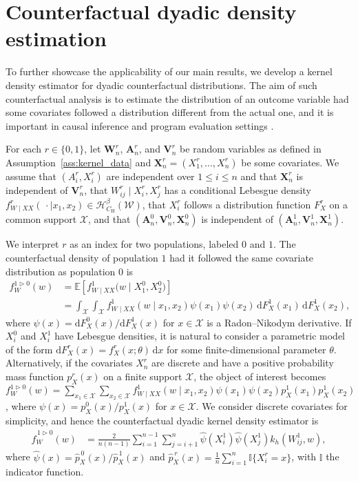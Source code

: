 \documentclass[11pt,lof]{puthesis}
\newcommand{\E}{\ensuremath{\mathbb{E}}}
\newcommand{\I}{\ensuremath{\mathbb{I}}}
\newcommand{\rH}{\ensuremath{\mathrm{H}}}
\newcommand{\bW}{\ensuremath{\mathbf{W}}}
\newcommand{\bX}{\ensuremath{\mathbf{X}}}
\newcommand{\bA}{\ensuremath{\mathbf{A}}}
\newcommand{\bV}{\ensuremath{\mathbf{V}}}
\newcommand{\cH}{\ensuremath{\mathcal{H}}}
\newcommand{\cX}{\ensuremath{\mathcal{X}}}
\newcommand{\cW}{\ensuremath{\mathcal{W}}}
\newcommand{\diff}[1]{\,\mathrm{d}#1}
\theoremstyle{break}
\theoremstyle{proof}
\begin{document}
\section{Counterfactual dyadic density estimation}
\label{sec:kernel_counterfactual}

To further showcase the applicability of our main results, we develop a kernel
density estimator for dyadic counterfactual distributions. The aim of such
counterfactual analysis is to estimate the distribution of an outcome variable
had some covariates followed a distribution different from the actual one, and
it is important in causal inference and program evaluation settings
\citep{dinardo1996distribution,chernozhukov2013inference}.

For each $r \in \{0,1\}$, let $\bW_n^r$, $\bA_n^r$, and $\bV_n^r$ be random
variables as defined in Assumption~\ref{ass:kernel_data} and
$\bX_n^r = (X_1^r, \ldots, X_n^r)$ be some covariates.
We assume that $(A_i^r, X_i^r)$ are independent over $1 \leq i \leq n$
and that $\bX_n^r$ is independent of $\bV_n^r$, that
$W_{i j}^r \mid X_i^r, X_j^r$ has a conditional Lebesgue density
$f_{W \mid XX}^r(\,\cdot \mid x_1, x_2) \in \cH^\beta_{C_\rH}(\cW)$,
that $X_i^r$ follows a distribution function $F_X^r$ on a common support $\cX$,
and that $(\bA_n^0, \bV_n^0, \bX_n^0)$
is independent of $(\bA_n^1, \bV_n^1, \bX_n^1)$.

We interpret $r$ as an index for two populations, labeled $0$ and $1$. The
counterfactual density of population $1$ had it followed the
same covariate distribution as population $0$ is
%
\begin{align*}
  f_W^{1 \triangleright 0}(w)
  &= \E\left[ f_{W \mid XX}^1\big(w \mid X_1^0, X_2^0\big) \right] \\
  &= \int_{\cX} \int_{\cX} f_{W \mid XX}^{1}(w \mid x_1, x_2)
  \psi(x_1) \psi(x_2) \diff F_X^{1}(x_1) \diff F_X^{1}(x_2),
\end{align*}
%
where $\psi(x) = \mathrm{d} F_X^0(x) / \mathrm{d} F_X^1(x)$ for $x \in \cX$
is a Radon--Nikodym derivative. If $X^0_i$ and $X^1_i$ have Lebesgue densities,
it is natural to consider a parametric model of the form
$\mathrm{d} F_X^{r}(x)=f_X^r(x;\theta)\diff x$
for some finite-dimensional parameter $\theta$.
Alternatively, if the covariates $X_n^r$ are discrete and have a positive
probability mass function $p_X^r(x)$ on a finite
support $\cX$, the object of interest becomes
$f_W^{1 \triangleright 0}(w)
= \sum_{x_1 \in \cX} \sum_{x_2 \in \cX}
f_{W \mid XX}^{1}(w \mid x_1, x_2) \psi(x_1) \psi(x_2)
p_X^{1}(x_1) p_X^{1}(x_2)$,
where $\psi(x) = p_X^0(x)/p_X^1(x)$ for $x \in \cX$.
We consider discrete covariates for simplicity,
and hence the counterfactual dyadic kernel density estimator is
%
\begin{align*}
  \hat f_W^{\,1 \triangleright 0}(w)
  &= \frac{2}{n(n-1)} \sum_{i=1}^{n-1} \sum_{j=i+1}^n
  \hat \psi(X_i^1) \hat \psi(X_j^1) k_h(W_{i j}^1, w),
\end{align*}
%
where $\hat\psi(x) = \hat p_X^{\,0}(x) / \hat p_X^{\,1}(x)$ and
$\hat p_X^{\,r}(x) = \frac{1}{n}\sum_{i = 1}^n \I\{X_i^r = x\}$,
with $\I$ the indicator function.
\end{document}
